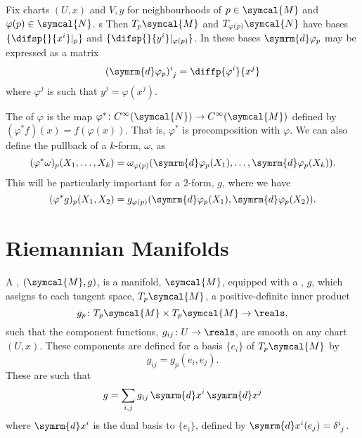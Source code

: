 \documentclass[fleqn]{NotesClass}
\newcommand{\manifold}{\symcal{M}}
\renewcommand{\dd}[1]{\,\symrm{d}#1}
\renewcommand{\dl}[1]{\symrm{d}#1}
\begin{document}
\begin{appendices}
        Fix charts \((U, x)\) and \(V, y\) for neighbourhoods of \(p \in \manifold\) and \(\varphi(p) \in \symcal{N}\). s
        Then \(T_p\manifold\) and \(T_{\varphi(p)}\symcal{N}\) have bases \(\{\difsp{}{x^i}|_p\}\) and \(\{\difsp{}{y^i}|_{\varphi(p)}\}\).
        In these bases \(\dl{\varphi_p}\) may be expressed as a matrix
        \begin{equation}
            \tensor{(\dl{\varphi_p})}{^i_j} = \diffp{\varphi^i}{x^j}
        \end{equation}
        where \(\varphi^j\) is such that \(y^j = \varphi(x^j)\).
        
        The  of \(\varphi\) is the map \(\varphi^* \colon C^{\infty}(\symcal{N}) \to C^{\infty}(\manifold)\) defined by \((\varphi^*f)(x) = f(\varphi(x))\).
        That is, \(\varphi^*\) is precomposition with \(\varphi\).
        We can also define the pullback of a \(k\)-form, \(\omega\), as
        \begin{equation}
            (\varphi^*\omega)_p(X_1, \dotsc, X_k) = \omega_{\varphi(p)}(\dl{\varphi_p}(X_1), \dotsc, \dl{\varphi_p}(X_k)).
        \end{equation}
        This will be particularly important for a 2-form, \(g\), where we have
        \begin{equation}
            (\varphi^*g)_p(X_1, X_2) = g_{\varphi(p)}(\dl{\varphi_p}(X_1), \dl{\varphi_p}(X_2)).
        \end{equation}
        
        
        \section{Riemannian Manifolds}
        A , \((\manifold, g)\), is a manifold, \(\manifold\), equipped with a , \(g\), which assigns to each tangent space, \(T_p\manifold\), a positive-definite inner product
        \begin{equation}
            g_p \colon T_p\manifold \times T_p\manifold \to \reals,
        \end{equation}
        such that the component functions, \(g_{ij} \colon U \to \reals\), are smooth on any chart \((U, x)\).
        These components are defined for a basis \(\{e_i\}\) of \(T_p\manifold\) by
        \begin{equation}
            g_{ij} = g_p(e_i, e_j).
        \end{equation}
        These are such that
        \begin{equation}
            g = \sum_{i,j} g_{ij} \dd{x^i} \dd{x^j}
        \end{equation}
        where \(\dl{x^i}\) is the dual basis to \(\{e_i\}\), defined by \(\dl{x^i}(e_j) = \tensor{\delta}{^{i}_j}\).
    \end{appendices}

	\backmatter
	\renewcommand{\glossaryname}{Acronyms}
	\printglossary[acronym]
	\printindex
\end{document}
